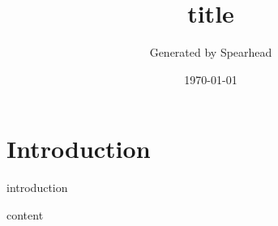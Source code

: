 \documentclass[a4paper,11pt]{article}
\begin{document}
\title{ {{ title }} }
\author{Generated by Spearhead}
\date{\today}
\maketitle

\section*{Introduction}
{{ introduction }}

\tableofcontents
\newpage
{{ content }}
\end{document}

